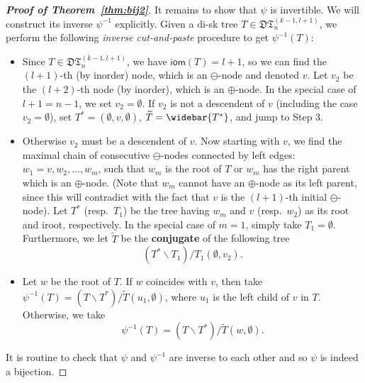 \documentclass[12pt]{amsart}
\numberwithin{equation}{section}
\theoremstyle{plain}
\theoremstyle{definition}
\newcommand{\DT}{\mathfrak{DT}}
\def\iom{\mathsf{iom}}
\begin{document}
\begin{proof}[{\bf Proof of Theorem~\ref{thm:bij2}}]
It remains to show that $\psi$ is invertible. We will construct its inverse $\psi^{-1}$ explicitly. Given a di-sk tree $T\in\DT_n^{(k-1,l+1)}$, we perform the following {\em inverse  cut-and-paste} procedure to get $\psi^{-1}(T)$: 
\begin{itemize}
\item[Step 1] 
Since $T\in\DT_n^{(k-1,l+1)}$, we have $\iom(T)=l+1$, so we can find the $(l+1)$-th (by inorder) node, which is an $\ominus$-node and denoted $v$. Let $v_2$ be the $(l+2)$-th node (by inorder), which is an $\oplus$-node. In the special case of $l+1=n-1$, we set $v_2=\emptyset$. If $v_2$ is not a descendent of $v$ (including the case $v_2=\emptyset$), set $T^*=(\emptyset,v,\emptyset)$, $\widetilde{T}=\widebar{T^*}$, and jump to Step 3.
\item[Step 2] 
Otherwise $v_2$ must be a descendent of $v$. Now starting with $v$, we find the maximal chain of consecutive $\ominus$-nodes connected by left edges: $w_1=v, w_2,\ldots,w_m$, such that $w_m$ is the root of $T$ or $w_m$ has the right parent which is an $\oplus$-node. (Note that $w_m$ cannot have an $\oplus$-node as its left parent, since this will contradict with the fact that $v$ is the $(l+1)$-th initial $\ominus$-node). Let $T^*$ (resp.~$T_1$) be the tree having $w_m$ and $v$ (resp.~$w_2$) as its root and iroot, respectively. In the special case of $m=1$, simply take $T_1=\emptyset$. Furthermore, we let $\widetilde{T}$ be the {\bf conjugate} of the following tree
$$(T^*\backslash T_1)/T_1(\emptyset,v_2).$$

\item[Step 3] 
Let $w$ be the root of $T$. If $w$ coincides with $v$, then take $\psi^{-1}(T)=(T\backslash T^*)/\widetilde{T}(u_1,\emptyset)$, where $u_1$ is the left child of $v$ in $T$. Otherwise, we take
$$\psi^{-1}(T)=(T\backslash T^*)/\widetilde{T}(w,\emptyset).$$

\end{itemize}
It is routine to check that $\psi$ and $\psi^{-1}$ are inverse to each other and so $\psi$ is indeed  a bijection. 


\end{proof}
\end{document}
